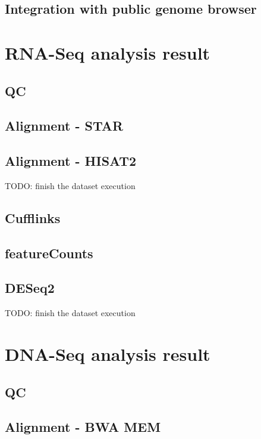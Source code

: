 \subsection{Integration with public genome browser}


\section{RNA-Seq analysis result}

\subsection{QC}

\subsection{Alignment - STAR}

\subsection{Alignment - HISAT2}

TODO: finish the dataset execution

\subsection{Cufflinks}

\subsection{featureCounts}

\subsection{DESeq2}

TODO: finish the dataset execution


\section{DNA-Seq analysis result}

\subsection{QC}

\subsection{Alignment - BWA MEM}

